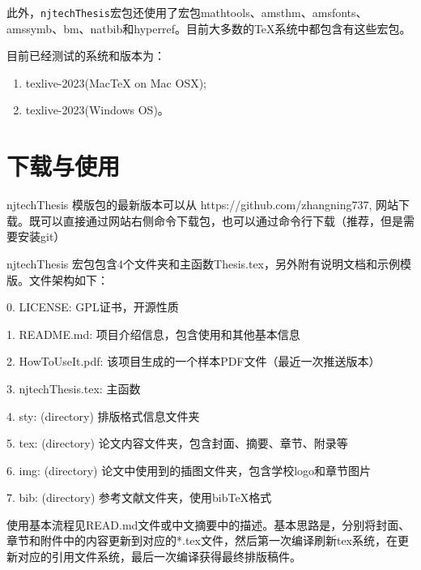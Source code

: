 此外，\texttt{njtechThesis}宏包还使用了宏包mathtools、amsthm、amsfonts、amssymb、bm、natbib和hyperref。目前大多数的\TeX{}系统中都包含有这些宏包。

目前已经测试的系统和版本为：
\begin{enumerate}
\item texlive-2023(MacTeX on Mac OSX);

\item texlive-2023(Windows OS)。

\end{enumerate}

{\color{blue}{说明：1. texlive一般每年更新一次，尽量使用最新版本，以免有些新的功能不能使用；

2. 在近期的论文版本中参考文献开始使用biber进行编译.

}}

\section{下载与使用}
\label{sec:howtouse}
njtechThesis 模版包的最新版本可以从 https://github.com/zhangning737, 网站下载。既可以直接通过网站右侧命令下载包，也可以通过命令行下载（推荐，但是需要安装git）

\begin{center}
  {\color{blue}{git clone https://github.com/zhangning737/njtechThesisMaster.git}}
\end{center}


njtechThesis 宏包包含4个文件夹和主函数Thesis.tex，另外附有说明文档和示例模版。文件架构如下：

0. LICENSE: GPL证书，开源性质

1. README.md: 项目介绍信息，包含使用和其他基本信息

2. HowToUseIt.pdf: 该项目生成的一个样本PDF文件（最近一次推送版本）

3. njtechThesis.tex: 主函数

4. sty: (directory) 排版格式信息文件夹

5. tex: (directory) 论文内容文件夹，包含封面、摘要、章节、附录等

6. img: (directory) 论文中使用到的插图文件夹，包含学校logo和章节图片

7. bib: (directory) 参考文献文件夹，使用bibTeX格式

使用基本流程见READ.md文件或中文摘要中的描述。基本思路是，分别将封面、章节和附件中的内容更新到对应的*.tex文件，然后第一次编译刷新tex系统，在更新对应的引用文件系统，最后一次编译获得最终排版稿件。

